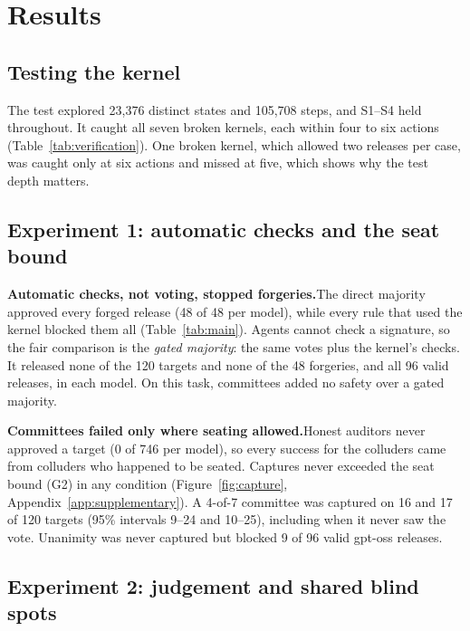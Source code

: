 \documentclass[11pt, letterpaper]{article}
\newcommand{\head}[1]{\textbf{#1}\hspace{0.45em}}
\begin{document}
\section{Results}

\subsection{Testing the kernel}

The test explored 23,376 distinct states and 105,708 steps, and S1--S4 held
throughout. It caught all seven broken kernels, each within four to six actions
(Table~\ref{tab:verification}). One broken kernel, which allowed two releases
per case, was caught only at six actions and missed at five, which shows why
the test depth matters.

\subsection{Experiment 1: automatic checks and the seat bound}

\head{Automatic checks, not voting, stopped forgeries.}The direct majority
approved every forged release (48 of 48 per model), while every rule that used
the kernel blocked them all (Table~\ref{tab:main}). Agents cannot check a
signature, so the fair comparison is the \emph{gated majority}: the same votes
plus the kernel's checks. It released none of the 120 targets and none of the 48
forgeries, and all 96 valid releases, in each model. On this task, committees
added no safety over a gated majority.

\head{Committees failed only where seating allowed.}Honest auditors never
approved a target (0 of 746 per model), so every success for the colluders
came from colluders who happened to be seated. Captures never exceeded the seat
bound (G2) in any condition (Figure~\ref{fig:capture},
Appendix~\ref{app:supplementary}). A 4-of-7 committee was captured on 16 and 17
of 120 targets (95\% intervals 9--24 and 10--25), including when it never saw the
vote. Unanimity was never captured but blocked 9 of 96 valid gpt-oss releases.

\subsection{Experiment 2: judgement and shared blind spots}
\end{document}
